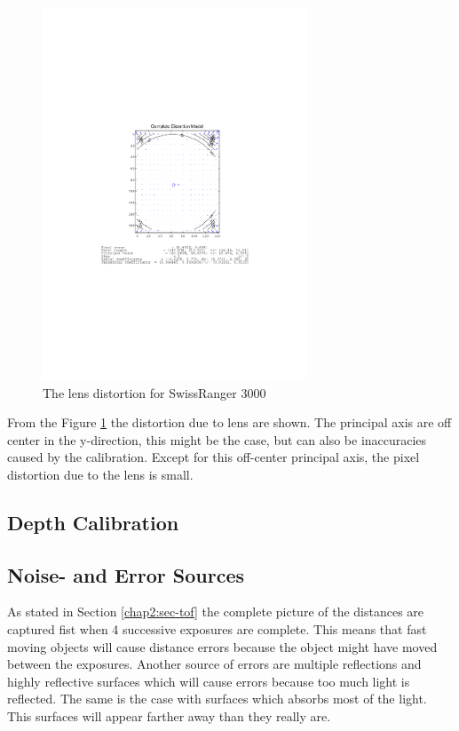 \begin{figure}[htbp]
    \centering
    \includegraphics[width=0.7\textwidth]{pics/sr3000_comp_dist}
    \caption{The lens distortion for SwissRanger 3000}
    \label{chap3:fig-sr3000-comp-lensdist}
\end{figure}
From the Figure \ref{chap3:fig-sr3000-comp-lensdist} the distortion due to lens are shown.
The principal axis are off center in the y-direction, this might be the case, but can also
be inaccuracies caused by the calibration. Except for this off-center principal axis, the
pixel distortion due to the lens is small.


\subsection{Depth Calibration}




\subsection{Noise- and Error Sources}
As stated in Section \ref{chap2:sec-tof} the complete picture of the distances are
captured fist when 4 successive exposures are complete. This means that fast moving
objects will cause distance errors because the object might have moved between the
exposures. Another source of errors are multiple reflections and highly reflective
surfaces which will cause errors because too much light is reflected. The same is the case
with surfaces which absorbs most of the light. This surfaces will appear farther away than
they really are. 





